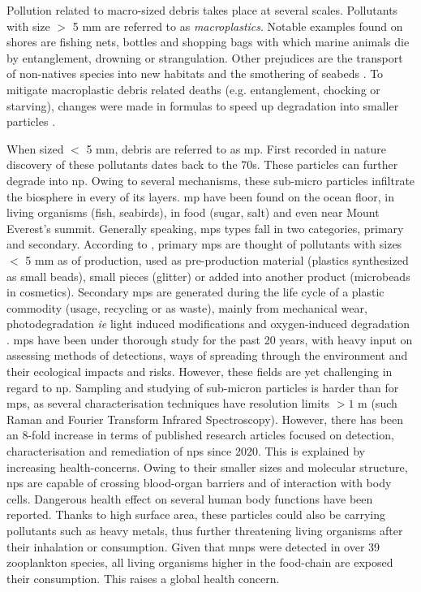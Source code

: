 Pollution related to macro-sized debris takes place at several scales. Pollutants with size $>$ 5 mm are referred to as \textit{macroplastics}. Notable examples found on shores are fishing nets, bottles and shopping bags with which marine animals die by entanglement, drowning or strangulation\autocite{m2008}. 
Other prejudices are the transport of non-natives species into new habitats and the smothering of seabeds \autocite{g2009,m2008}. 
To mitigate macroplastic debris related deaths (e.g. entanglement, chocking or starving), changes were made in formulas to speed up degradation into smaller particles \autocite{m2008}.

When sized $<$ 5 mm, debris are referred to as \gls{mp}. 
First recorded in nature discovery of these pollutants dates back to the 70s\autocite{c1972,h1974}. 
These particles can further degrade into \gls{np}. 
Owing to several mechanisms, these sub-micro particles infiltrate the biosphere in every of its layers. \Gls{mp} have been found on the ocean floor\autocite{woo2014}, in living organisms (fish\autocite{su2019}, seabirds\autocite{tou2010}), in food (sugar\autocite{lie2013}, salt\autocite{yang2015}) and even near Mount Everest's summit.\autocite{nap2020}
Generally speaking, \gls{mp}s types fall in two categories, primary and secondary. According to \citet{t2024}, primary \gls{mp}s are thought of pollutants with sizes $<$ 5 mm as of production, used as pre-production material (plastics synthesized as small beads), small pieces (glitter) or added into another product (microbeads in cosmetics). Secondary \gls{mp}s are generated during the life cycle of a plastic commodity (usage, recycling or as waste), mainly from mechanical wear, photodegradation \textit{ie} light induced modifications and oxygen-induced degradation \autocite{dav2021}. 
\Gls{mp}s have been under thorough study for the past 20 years, with heavy input on assessing methods of detections, ways of spreading through the environment and their ecological impacts and risks. However, these fields are yet challenging in regard to \gls{np}. Sampling and studying of sub-micron particles is harder than for \gls{mp}s, as several characterisation techniques have resolution limits $ > 1 $ \textmu m (such \textmu Raman and \textmu Fourier Transform Infrared Spectroscopy).\autocite{bru2022} However, there has been an 8-fold increase in terms of published research articles focused on detection, characterisation and remediation of \gls{np}s since 2020.\autocite{z2026}
This is explained by increasing health-concerns. Owing to their smaller sizes and molecular structure, \gls{np}s are capable of crossing blood-organ barriers\autocite{x2024,k2023,s2022} and of interaction with body cells.\autocite{k2025,m2021,k2021} Dangerous health effect on several human body functions have been reported.\autocite{kir2026} Thanks to high surface area, these particles could also be carrying pollutants such as heavy metals, thus further threatening living organisms after their inhalation or consumption. Given that \glspl{mnp} were detected in over 39 zooplankton species, all living organisms higher in the food-chain are exposed their consumption. \autocite{bot2019} This raises a global health concern.\autocite{kir2026} 
